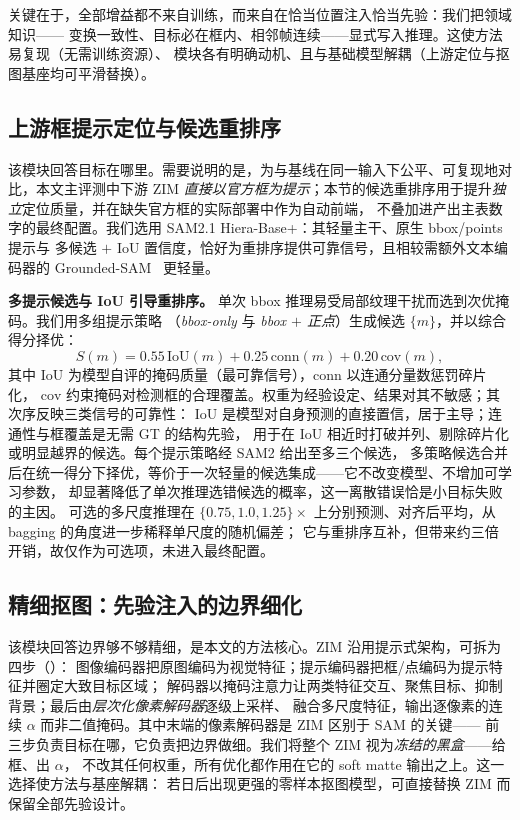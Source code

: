 \documentclass[final]{cvpr}
\begin{document}
关键在于，全部增益都不来自训练，而来自在恰当位置注入恰当先验：我们把领域知识——
变换一致性、目标必在框内、相邻帧连续——显式写入推理。这使方法易复现（无需训练资源）、
模块各有明确动机、且与基础模型解耦（上游定位与抠图基座均可平滑替换）。

\subsection{上游框提示定位与候选重排序}
\label{sec:upstream}
该模块回答目标在哪里。需要说明的是，为与基线在同一输入下公平、可复现地对比，本文主评测中下游 ZIM
\emph{直接以官方框为提示}；本节的候选重排序用于提升\emph{独立}定位质量，并在缺失官方框的实际部署中作为自动前端，
不叠加进产出主表数字的最终配置。我们选用 SAM2.1 Hiera-Base+：其轻量主干、原生 bbox/points 提示与
多候选 $+$ IoU 置信度，恰好为重排序提供可靠信号，且相较需额外文本编码器的 Grounded-SAM~\cite{groundedsam} 更轻量。

\noindent\textbf{多提示候选与 IoU 引导重排序。}
单次 bbox 推理易受局部纹理干扰而选到次优掩码。我们用多组提示策略
（\emph{bbox-only} 与 \emph{bbox $+$ 正点}）生成候选 $\{m\}$，并以综合得分择优：
\begin{equation}
S(m)=0.55\,\mathrm{IoU}(m)+0.25\,\mathrm{conn}(m)+0.20\,\mathrm{cov}(m),
\label{eq:rerank}
\end{equation}
其中 $\mathrm{IoU}$ 为模型自评的掩码质量（最可靠信号），$\mathrm{conn}$ 以连通分量数惩罚碎片化，
$\mathrm{cov}$ 约束掩码对检测框的合理覆盖。权重为经验设定、结果对其不敏感；其次序反映三类信号的可靠性：
IoU 是模型对自身预测的直接置信，居于主导；连通性与框覆盖是无需 GT 的结构先验，
用于在 IoU 相近时打破并列、剔除碎片化或明显越界的候选。每个提示策略经 SAM2 给出至多三个候选，
多策略候选合并后在统一得分下择优，等价于一次轻量的候选集成——它不改变模型、不增加可学习参数，
却显著降低了单次推理选错候选的概率，这一离散错误恰是小目标失败的主因。
可选的多尺度推理在 $\{0.75,1.0,1.25\}\times$ 上分别预测、对齐后平均，从 bagging 的角度进一步稀释单尺度的随机偏差；
它与重排序互补，但带来约三倍开销，故仅作为可选项，未进入最终配置。

\subsection{精细抠图：先验注入的边界细化}
\label{sec:matting}
该模块回答边界够不够精细，是本文的方法核心。ZIM 沿用提示式架构，可拆为四步（）：
图像编码器把原图编码为视觉特征；提示编码器把框/点编码为提示特征并圈定大致目标区域；
解码器以掩码注意力让两类特征交互、聚焦目标、抑制背景；最后由\emph{层次化像素解码器}逐级上采样、
融合多尺度特征，输出逐像素的连续 $\alpha$ 而非二值掩码。其中末端的像素解码器是 ZIM 区别于 SAM 的关键——
前三步负责目标在哪，它负责把边界做细。我们将整个 ZIM 视为\emph{冻结的黑盒}——给框、出 $\alpha$，
不改其任何权重，所有优化都作用在它的 soft matte 输出之上。这一选择使方法与基座解耦：
若日后出现更强的零样本抠图模型，可直接替换 ZIM 而保留全部先验设计。
\end{document}
